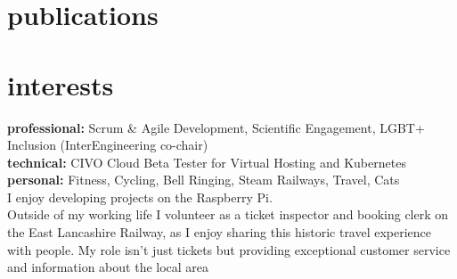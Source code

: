 \documentclass[]{cv-style}          %
\begin{document}



\section{publications}
\begin{entrylist}
\end{entrylist}

\section{interests}
  \vspace{-0.2cm}

\textbf{professional:} Scrum \& Agile Development, Scientific Engagement, LGBT+ Inclusion (InterEngineering co-chair)\\
\textbf{technical:} CIVO Cloud Beta Tester for Virtual Hosting and Kubernetes\\
\textbf{personal:} Fitness, Cycling, Bell Ringing, Steam Railways, Travel, Cats\\
I enjoy developing projects on the Raspberry Pi.\\
Outside of my working life I volunteer as a ticket inspector and booking clerk on the East Lancashire Railway, as I enjoy sharing this historic travel experience with people.
My role isn't just tickets but providing exceptional customer service and information about the local area
\end{document}
